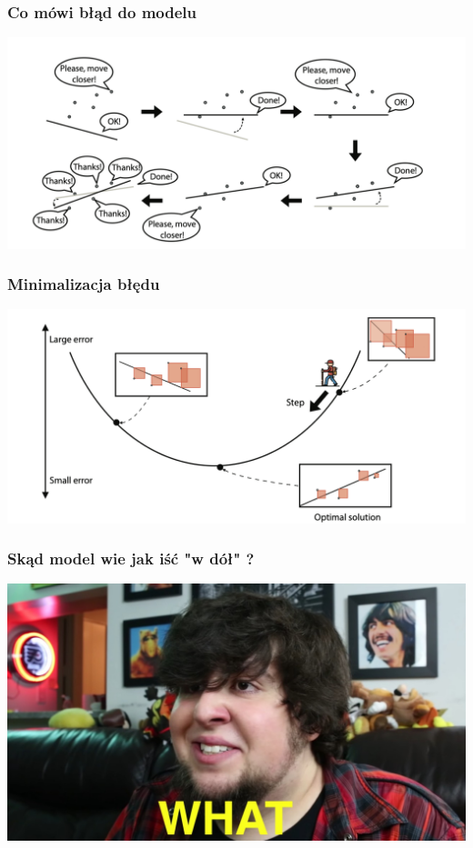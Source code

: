 \documentclass[smaller]{beamer}
\begin{document}

\begin{frame}
\frametitle{Co mówi błąd do modelu}
    \centering
    \includegraphics[width=\textwidth,height=0.8\textheight,keepaspectratio]{../manifest/points-move.png}
\end{frame}


\begin{frame}
\frametitle{Minimalizacja błędu}
    \centering
    \includegraphics[width=\textwidth,height=0.8\textheight,keepaspectratio]{../manifest/error-optim.png}
\end{frame}


\begin{frame}
\frametitle{Skąd model wie jak iść "w dół" ?}
    \centering
    \includegraphics[width=\textwidth,height=0.8\textheight,keepaspectratio]{../manifest/what-meme.jpg}
\end{frame}
\end{document}

